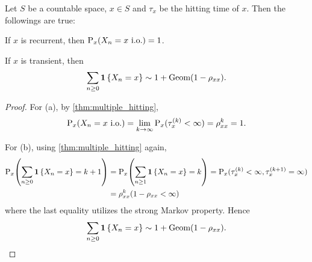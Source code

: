 \begin{proposition}
    Let $S$ be a countable space, $x\in S$ and $\tau_x$ be the hitting time of $x$. 
    Then the followings are true: 
    \begin{thmenum}
        \item If $x$ is recurrent, then $\P_x(X_n = x\text{ i.o.}) = 1$. 
        \item If $x$ is transient, then 
        \begin{equation*}
            \sum_{n\geq 0}\one\set{X_n = x}\sim 1 + \text{Geom}(1-\rho_{xx}). 
        \end{equation*}
    \end{thmenum}
\end{proposition}
\begin{proof}
    For (a), by \cref{thm:multiple_hitting}, 
    \begin{equation*}
        \P_x(X_n = x\text{ i.o.}) = \lim_{k\to\infty}\P_x(\tau_x^{(k)}<\infty) = \rho_{xx}^k = 1.
    \end{equation*}
    
    For (b), using \cref{thm:multiple_hitting} again, 
    \begin{equation*}
        \begin{split}
            \P_x\pth{\sum_{n\geq 0}\one\set{X_n = x} = k+1} &= \P_x\pth{\sum_{n\geq 1}\one\set{X_n = x} = k} 
            = \P_x(\tau_x^{(k)}<\infty, \tau_x^{(k+1)}=\infty) \\ 
            &= \rho_{xx}^k(1-\rho_{xx}<\infty)
        \end{split}
    \end{equation*}
    where the last equality utilizes the strong Markov property. Hence 
    \begin{equation*}
        \sum_{n\geq 0}\one\set{X_n = x} \sim 1 + \text{Geom}(1-\rho_{xx}). 
    \end{equation*}
\end{proof}
